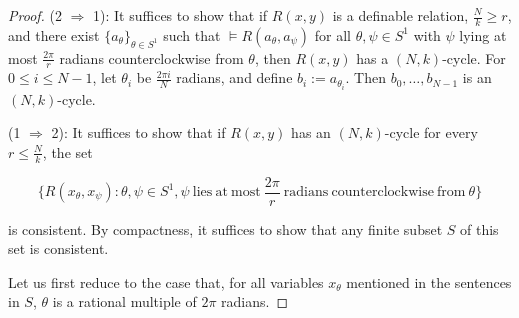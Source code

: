 \documentclass{amsart}
\theoremstyle{definition}
\theoremstyle{remark}
\numberwithin{equation}{section}
\begin{document}
\begin{proof}
    (2 $\Rightarrow$ 1): It suffices to show that if $R(x, y)$ is a definable relation, $\frac{N}{k} \geq r$, and there exist $\{a_{\theta}\}_{\theta \in S^{1}}$ such that $\models R(a_{\theta}, a_{\psi})$ for all $\theta, \psi \in S^{1}$ with $\psi$ lying at most $\frac{2\pi}{r}$ radians counterclockwise from $\theta$, then $R(x, y)$ has a $(N, k)$-cycle. For $0 \leq i \leq N-1$, let $\theta_{i}$ be $\frac{2\pi i}{N}$ radians, and define $b_{i} := a_{\theta_{i}}$. Then $b_{0}, \ldots, b_{N-1}$ is an $(N, k)$-cycle.

    (1 $\Rightarrow$ 2): It suffices to show that if $R(x, y)$ has an $(N, k)$-cycle for every $r \leq \frac{N}{k}$, the set

    $$\{R(x_{\theta}, x_{\psi}): \theta, \psi \in S^{1}, \psi \mathrm{\: lies \: at \: most \:}\frac{2\pi}{r}\mathrm{\: radians \: counterclockwise \: from \:} \theta \}$$

    is consistent. By compactness, it suffices to show that any finite subset $S$ of this set is consistent.
    
    Let us first reduce to the case that, for all variables $x_{\theta}$ mentioned in the sentences in $S$, $\theta$ is a rational multiple of $2\pi$ radians.
    

\end{proof}
\end{document}
